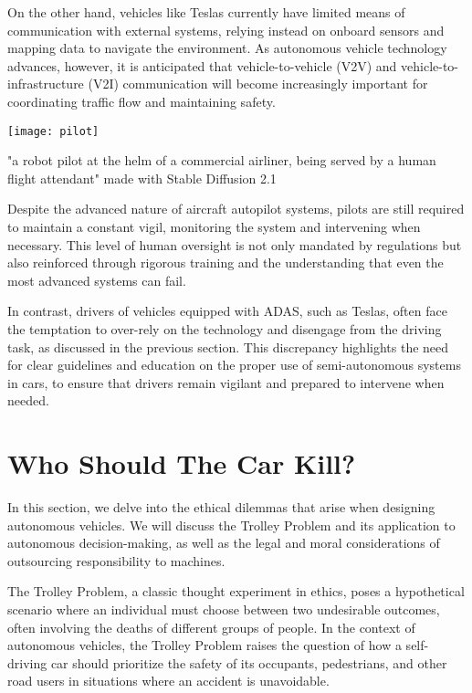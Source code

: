 On the other hand, vehicles like Teslas currently have limited means of communication with external systems, relying instead on onboard sensors and mapping data to navigate the environment. As autonomous vehicle technology advances, however, it is anticipated that vehicle-to-vehicle (V2V) and vehicle-to-infrastructure (V2I) communication will become increasingly important for coordinating traffic flow and maintaining safety.

\begin{marginfigure}[-5.5cm]
        \texttt{[image: pilot]}
        \caption{"a robot pilot at the helm of a commercial airliner, being served by a human flight attendant" made with Stable Diffusion 2.1}
\end{marginfigure}

Despite the advanced nature of aircraft autopilot systems, pilots are still required to maintain a constant vigil, monitoring the system and intervening when necessary. This level of human oversight is not only mandated by regulations but also reinforced through rigorous training and the understanding that even the most advanced systems can fail.

In contrast, drivers of vehicles equipped with ADAS, such as Teslas, often face the temptation to over-rely on the technology and disengage from the driving task, as discussed in the previous section. This discrepancy highlights the need for clear guidelines and education on the proper use of semi-autonomous systems in cars, to ensure that drivers remain vigilant and prepared to intervene when needed.

\section{Who Should The Car Kill?}

In this section, we delve into the ethical dilemmas that arise when designing autonomous vehicles. We will discuss the Trolley Problem and its application to autonomous decision-making, as well as the legal and moral considerations of outsourcing responsibility to machines.

The Trolley Problem, a classic thought experiment in ethics, poses a hypothetical scenario where an individual must choose between two undesirable outcomes, often involving the deaths of different groups of people. In the context of autonomous vehicles, the Trolley Problem raises the question of how a self-driving car should prioritize the safety of its occupants, pedestrians, and other road users in situations where an accident is unavoidable.

